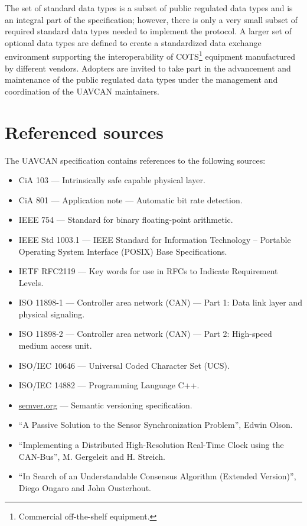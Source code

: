 The set of standard data types is a subset of public regulated data types and is an integral part of the specification;
however, there is only a very small subset of required standard data types needed to implement the protocol.
A larger set of optional data types are defined to create a standardized data exchange environment
supporting the interoperability of COTS\footnote{Commercial off-the-shelf equipment.}
equipment manufactured by different vendors.
Adopters are invited to take part in the advancement and maintenance of the public regulated data types
under the management and coordination of the UAVCAN maintainers.

\section{Referenced sources}

The UAVCAN specification contains references to the following sources:

\begin{itemize}
    \item CiA 103 --- Intrinsically safe capable physical layer.
    \item CiA 801 --- Application note --- Automatic bit rate detection.

    \item IEEE 754 --- Standard for binary floating-point arithmetic.
    \item IEEE Std 1003.1 --- IEEE Standard for Information Technology --
          Portable Operating System Interface (POSIX) Base Specifications.

    \item IETF RFC2119 --- Key words for use in RFCs to Indicate Requirement Levels.

    \item ISO 11898-1 --- Controller area network (CAN) --- Part 1: Data link layer and physical signaling.
    \item ISO 11898-2 --- Controller area network (CAN) --- Part 2: High-speed medium access unit.
    \item ISO/IEC 10646 --- Universal Coded Character Set (UCS).
    \item ISO/IEC 14882 --- Programming Language C++.

    \item \href{http://semver.org}{semver.org} --- Semantic versioning specification.

    \item ``A Passive Solution to the Sensor Synchronization Problem'', Edwin Olson.
    \item ``Implementing a Distributed High-Resolution Real-Time Clock using the CAN-Bus'', M. Gergeleit and H. Streich.
    \item ``In Search of an Understandable Consensus Algorithm (Extended Version)'', Diego Ongaro and John Ousterhout.
\end{itemize}

